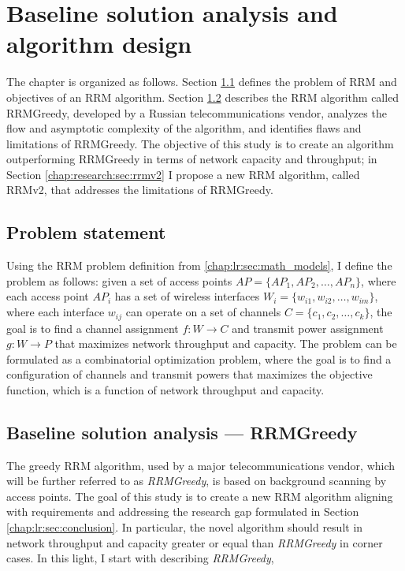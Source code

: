 \newcommand{\rrmG}{$\boldsymbol{G}$}

\chapter{Baseline solution analysis and algorithm design}
\label{chap:research}

The chapter is organized as follows. Section \ref{chap:research:sec:problem_statement} defines the problem of RRM and objectives of an RRM algorithm.
Section \ref{sec:baseline} describes the RRM algorithm called RRMGreedy, developed by a Russian telecommunications vendor, analyzes the flow and asymptotic complexity of the algorithm, and identifies flaws and limitations of RRMGreedy. The objective of this study is to create an algorithm outperforming RRMGreedy in terms of network capacity and throughput; in Section \ref{chap:research:sec:rrmv2} I propose a new RRM algorithm, called RRMv2, that addresses the limitations of RRMGreedy.


\section{Problem statement}
\label{chap:research:sec:problem_statement}
Using the RRM problem definition from \ref{chap:lr:sec:math_models}, I define the problem as follows: given a set of access points $AP = \{AP_1, AP_2, \ldots, AP_n\}$, where each access point $AP_i$ has a set of wireless interfaces $W_i = \{w_{i1}, w_{i2}, \ldots, w_{im}\}$, where each interface $w_{ij}$ can operate on a set of channels $C = \{c_1, c_2, \ldots, c_k\}$, the goal is to find a channel assignment $f: W \to C$ and transmit power assignment $g: W \to P$ that maximizes network throughput and capacity. The problem can be formulated as a combinatorial optimization problem, where the goal is to find a configuration of channels and transmit powers that maximizes the objective function, which is a function of network throughput and capacity.

\section{Baseline solution analysis --- RRMGreedy}
\label{sec:baseline}
The greedy RRM algorithm, used by a major telecommunications vendor, which will be further referred to as \textit{RRMGreedy}, is based on background scanning by access points. The goal of this study is to create a new RRM algorithm aligning with requirements and addressing the research gap formulated in Section \ref{chap:lr:sec:conclusion}.
In particular, the novel algorithm should result in network throughput and capacity greater or equal than \textit{RRMGreedy} in corner cases. In this light, I start with describing \textit{RRMGreedy},

